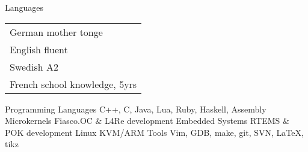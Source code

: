   \begin{cvskills}
  	\cvskill
		{Languages}
		{
		  \def\arraystretch{1}
		  \begin{tabular}[]{l}
		  German \hspace{4.9mm} mother tonge \\
		  English \hspace{6mm} fluent \\
		  Swedish \hspace{4.5mm} A2 \\
		  French \hspace{6.6mm} school knowledge, 5yrs
		  \end{tabular}
		  \def\arraystretch{1.2}
		}
	\cvskill
		{Programming Languages}
		{C++, C, Java, Lua, Ruby, Haskell, Assembly}
	\cvskill
		{Microkernels}
		{Fiasco.OC \& L4Re development}
	\cvskill
		{Embedded Systems}
		{RTEMS \& POK development}
	\cvskill
		{Linux}
		{KVM/ARM}
	\cvskill
		{Tools}
		{Vim, GDB, make, git, SVN, LaTeX, tikz}
  \end{cvskills}
